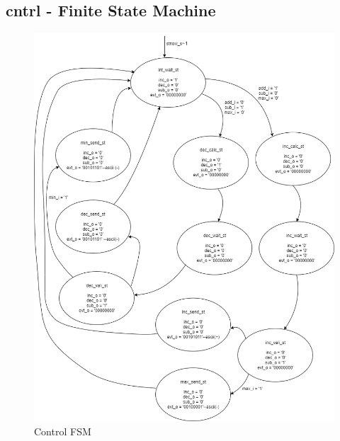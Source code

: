 \documentclass[12pt,a4 paper] {report}
\begin{document}
\newpage

\subsection*{cntrl - Finite State Machine}
\begin{figure}[h]
	\centering	
	\includegraphics[scale=0.3]{../png/Control.png}
	\caption{Control FSM}
\end{figure}
\end{document}
